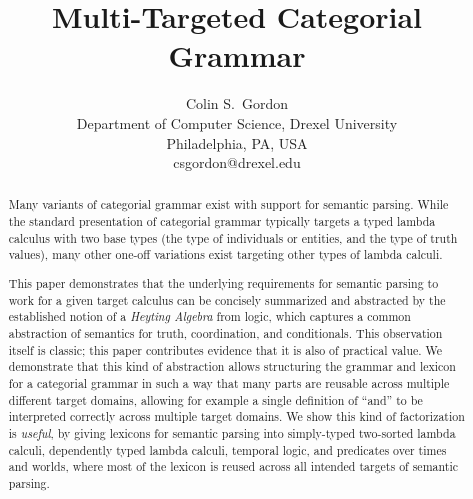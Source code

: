 \documentclass[11pt,a4paper,acceptedWithA]{article}
\title{Multi-Targeted Categorial Grammar}
\author{
  Colin S.\ Gordon\\
  Department of Computer Science, Drexel University\\
  Philadelphia, PA, USA\\
  {\sf csgordon@drexel.edu} \\
}
\date{}
\begin{document}
\maketitle
\begin{abstract}
Many variants of categorial grammar exist with support for semantic parsing. While the standard presentation of categorial grammar typically targets a typed lambda calculus with two base types (the type of individuals or entities, and the type of truth values), many other one-off variations exist targeting other types of lambda calculi.

This paper demonstrates that the underlying requirements for semantic parsing to work for a given target calculus can be concisely summarized and abstracted by the established notion of a \emph{Heyting Algebra} from logic, which captures a common abstraction of semantics for truth, coordination, and conditionals. This observation itself is classic; this paper contributes evidence that it is also of practical value.
We demonstrate that this kind of abstraction allows structuring the grammar and lexicon for a categorial grammar in such a way that many parts are reusable across multiple different target domains, allowing for example a single definition of ``and'' to be interpreted correctly across multiple target domains.
We show this kind of factorization is \emph{useful}, by giving lexicons for semantic parsing into simply-typed two-sorted lambda calculi, dependently typed lambda calculi, temporal logic, and predicates over times and worlds, where most of the lexicon is reused across all intended targets of semantic parsing.
\end{abstract}

\end{document}
